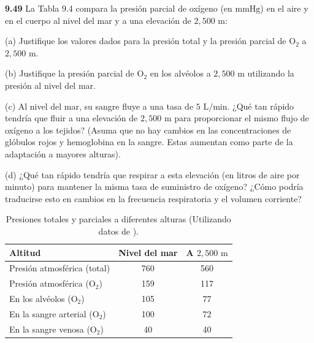 \documentclass[12pt]{book}
\begin{document}
\noindent \textbf{9.49} La Tabla 9.4 compara la presión parcial de oxígeno (en $\text{mmHg}$) en el aire y en el cuerpo al nivel del mar y a una elevación de $2{,}500\text{ m}$:
\par\noindent (a) Justifique los valores dados para la presión total y la presión parcial de $\text{O}_2$ a $2{,}500\text{ m}$.
\par\noindent (b) Justifique la presión parcial de $\text{O}_2$ en los alvéolos a $2{,}500\text{ m}$ utilizando la presión al nivel del mar.
\par\noindent (c) Al nivel del mar, su sangre fluye a una tasa de $5\text{ L/min}$. ¿Qué tan rápido tendría que fluir a una elevación de $2{,}500\text{ m}$ para proporcionar el mismo flujo de oxígeno a los tejidos? (Asuma que no hay cambios en las concentraciones de glóbulos rojos y hemoglobina en la sangre. Estas aumentan como parte de la adaptación a mayores alturas).
\par\noindent (d) ¿Qué tan rápido tendría que respirar a esta elevación (en litros de aire por minuto) para mantener la misma tasa de suministro de oxígeno? ¿Cómo podría traducirse esto en cambios en la frecuencia respiratoria y el volumen corriente?

\begin{table}[htbp]
  \centering
  \caption{Presiones totales y parciales a diferentes alturas (Utilizando datos de \cite{43}).}
  \label{tab:9.4}
  \begin{tabularx}{\textwidth}{Xcc}
    \toprule
    Altitud & Nivel del mar & A $2{,}500\text{ m}$ \\
    \midrule
    Presión atmosférica (total) & 760 & 560 \\
    Presión atmosférica ($\text{O}_2$) & 159 & 117 \\
    En los alvéolos ($\text{O}_2$) & 105 & 77 \\
    En la sangre arterial ($\text{O}_2$) & 100 & 72 \\
    En la sangre venosa ($\text{O}_2$) & 40 & 40 \\
    \bottomrule
  \end{tabularx}
\end{table}

\end{document}
